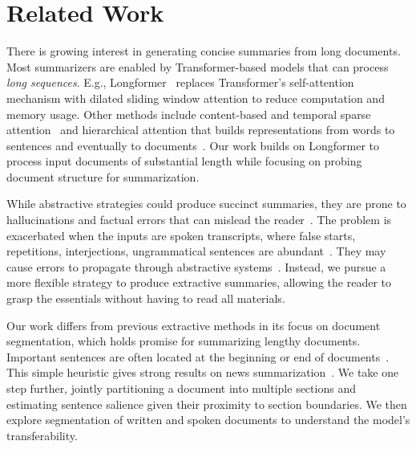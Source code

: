 \documentclass[11pt]{article}
\begin{document}
\section{Related Work}


There is growing interest in generating concise summaries from long documents.
Most summarizers are enabled by Transformer-based models that can process \emph{long sequences}. 
E.g., Longformer~\cite{Beltagy:2020} replaces Transformer's self-attention mechanism with dilated sliding window attention to reduce computation and memory usage. 
Other methods include content-based and temporal sparse attention~\cite{child2019generating,zaheer2020bigbird,roy-etal-2021-efficient,huang-etal-2021-efficient}
and hierarchical attention that builds representations from words to sentences and eventually to documents~\cite{zhang-etal-2019-hibert,Rohde-etal_2020}.
Our work builds on Longformer to process input documents of substantial length while focusing on probing document structure for summarization.



While abstractive strategies could produce succinct summaries, 
they are prone to hallucinations and factual errors that can mislead the reader~\cite{falke-etal-2019-ranking,kryscinski-etal-2020-evaluating,maynez-etal-2020-faithfulness,pagnoni-etal-2021-understanding}. 
The problem is exacerbated when the inputs are spoken transcripts,
where false starts, repetitions, interjections, ungrammatical sentences are abundant~\cite{Shriberg:1994}.
They may cause errors to propagate through abstractive systems~\cite{shang-etal-2018-unsupervised,li-etal-2019-keep,zhu-etal-2020-hierarchical,koay-etal-2020-domain,koay-etal-2021-sliding,zhong-etal-2021-qmsum,chen-etal-2022-summscreen}. 
Instead, we pursue a more flexible strategy to produce extractive summaries, allowing the reader to grasp the essentials without having to read all materials.

Our work differs from previous extractive methods in its focus on document segmentation,
which holds promise for summarizing lengthy documents.
Important sentences are often located at the beginning or end of documents~\cite{Baxendale:1958,marcu-1998-improving}.
This simple heuristic gives strong results on news summarization~\cite{kedzie-etal-2018-content,chen-bansal-2018-fast,narayan-etal-2018-ranking,mao2021dyle,liu-etal-2022-brio}.
We take one step further, jointly partitioning a document into multiple sections and 
estimating sentence salience given their proximity to section boundaries.
We then explore segmentation of written and spoken documents to understand the model's transferability.
\end{document}

